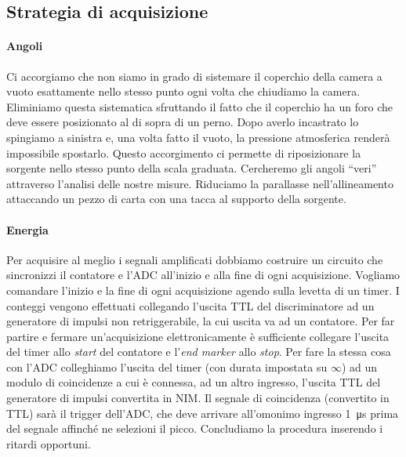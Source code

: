 \subsection{Strategia di acquisizione}

\paragraph{Angoli}
\label{spiegazione}

Ci accorgiamo che non siamo in grado di sistemare il coperchio della camera a vuoto esattamente nello stesso punto ogni volta che chiudiamo la camera. Eliminiamo questa sistematica sfruttando il fatto che il coperchio ha un foro che deve essere posizionato al di sopra di un perno. Dopo averlo incastrato lo spingiamo a sinistra e, una volta fatto il vuoto, la pressione atmosferica renderà impossibile spostarlo.
Questo accorgimento ci permette di riposizionare la sorgente nello stesso punto della scala graduata. Cercheremo gli angoli ``veri'' attraverso l'analisi delle nostre misure. 
Riduciamo la parallasse nell'allineamento attaccando un pezzo di carta con una tacca al supporto della sorgente.

\paragraph{Energia}
Per acquisire al meglio i segnali amplificati dobbiamo costruire un circuito che sincronizzi il contatore e l'ADC all'inizio e alla fine di ogni acquisizione.
Vogliamo comandare l'inizio e la fine di ogni acquisizione agendo sulla levetta di un timer.
I conteggi vengono effettuati collegando l'uscita TTL del discriminatore ad un generatore di impulsi non retriggerabile, la cui uscita va ad un contatore. Per far partire e fermare un'acquisizione elettronicamente è sufficiente collegare l'uscita del timer allo \emph{start} del contatore e l'\emph{end marker} allo \emph{stop}.
Per fare la stessa cosa con l'ADC colleghiamo l'uscita del timer (con durata impostata su $\infty$) ad un modulo di coincidenze a cui è connessa, ad un altro ingresso, l'uscita TTL del generatore di impulsi convertita in NIM. Il segnale di coincidenza (convertito in TTL) sarà il trigger dell'ADC, che deve arrivare all'omonimo ingresso \SI{1}{\micro s} prima del segnale affinché ne selezioni il picco.
Concludiamo la procedura inserendo i ritardi opportuni.

